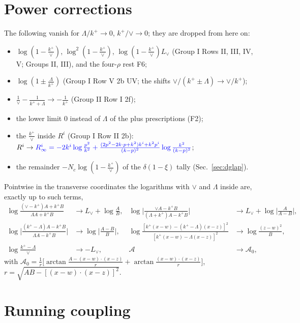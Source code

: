 \documentclass[10pt]{article}
\numberwithin{equation}{section}
\newcommand{\new}[1]{{\color{blue}#1}}
\newcommand{\Lv}{L_{\vee}}
\begin{document}
\section{Power corrections}\label{sec:power}
The following vanish for $\Lambda/k^+\to0$, $k^+/\vee\to0$; they are dropped from here on:
\begin{itemize}
\item $\log(1-\frac{k^+}{\vee})$, $\log^2(1-\frac{k^+}{\vee})$, $\log(1-\frac{k^+}{\vee})\Lv$ (Group I Rows II, III, IV, V; Groups II, III), and the four-$\rho$ rest F6;
\item $\log(1\pm\frac{\Lambda}{k^+})$ (Group I Row V 2b UV; the shifts $\vee/(k^+\pm\Lambda)\to\vee/k^+$);
\item $\frac{1}{\vee}-\frac{1}{k^++\Lambda}\to-\frac{1}{k^+}$ (Group II Row I 2f);
\item the lower limit $0$ instead of $\Lambda$ of the plus prescriptions (F2);
\item the $\frac{k^+}{\vee}$ inside $R^i$ (Group I Row II 2b): $R^i\to\new{R^i_\infty=-2k^i\log\frac{p^2}{k^2}+\frac{(2p^2-2k\cdot p+k^2)k^i+k^2p^i}{(k-p)^2}\log\frac{k^2}{(k-p)^2}}$;
\item the remainder $-N_c\log(1-\frac{k^+}{\vee})$ of the $\delta(1-\xi)$ tally (Sec.~\ref{sec:dglap}).
\end{itemize}
Pointwise in the transverse coordinates the logarithms with $\vee$ and $\Lambda$ inside are, exactly up to such terms,
\begin{align*}
\log\frac{(\vee-k^+)A+k^+B}{\Lambda A+k^+B}&\to\Lv+\log\frac AB, &
\log\Big|\frac{\vee A-k^+B}{(\Lambda+k^+)A-k^+B}\Big|&\to\Lv+\log\Big|\frac{A}{A-B}\Big|,\\
\log\Big|\frac{(k^+-\Lambda)A-k^+B}{\Lambda A-k^+B}\Big|&\to\log\Big|\frac{A-B}{B}\Big|, &
\log\frac{[k^+(x-w)-(k^+-\Lambda)(x-z)]^2}{[k^+(x-w)-\Lambda(x-z)]^2}&\to\log\frac{(z-w)^2}{B},\\
\log\frac{k^+-\Lambda}{\vee}&\to-\Lv, & \mathcal A&\to\mathcal A_0,
\end{align*}
with $\mathcal A_0=\frac{1}{r}\big[\arctan\frac{A-(x-w)\cdot(x-z)}{r}+\arctan\frac{(x-w)\cdot(x-z)}{r}\big]$, $r=\sqrt{AB-[(x-w)\cdot(x-z)]^2}$.

\section{Running coupling}\label{sec:rc}
\end{document}
